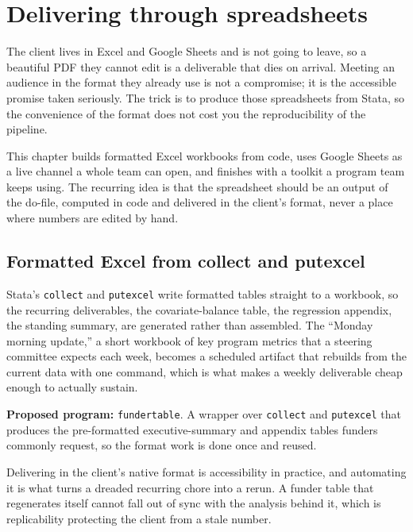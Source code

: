 \documentclass[
    a4paper,
    fontsize=10pt,
    twoside=true,
    numbers=noenddot,
]{kaobook}
\begin{document}
\chapter{Delivering through spreadsheets}\label{ch:sheets}

The client lives in Excel and Google Sheets and is not going to leave, so a beautiful PDF they cannot edit is a deliverable that dies on arrival. Meeting an audience in the format they already use is not a compromise; it is the accessible promise taken seriously. The trick is to produce those spreadsheets from Stata, so the convenience of the format does not cost you the reproducibility of the pipeline.

This chapter builds formatted Excel workbooks from code, uses Google Sheets as a live channel a whole team can open, and finishes with a toolkit a program team keeps using. The recurring idea is that the spreadsheet should be an output of the do-file, computed in code and delivered in the client's format, never a place where numbers are edited by hand.

\section{Formatted Excel from collect and putexcel}
Stata's \texttt{collect} and \texttt{putexcel} write formatted tables straight to a workbook, so the recurring deliverables, the covariate-balance table, the regression appendix, the standing summary, are generated rather than assembled. The \enquote{Monday morning update,} a short workbook of key program metrics that a steering committee expects each week, becomes a scheduled artifact that rebuilds from the current data with one command, which is what makes a weekly deliverable cheap enough to actually sustain.

\begin{kaobox}[frametitle=Ado-file Idea: \texttt{fundertable}]
\textbf{Proposed program:} \texttt{fundertable}. A wrapper over \texttt{collect} and \texttt{putexcel} that produces the pre-formatted executive-summary and appendix tables funders commonly request, so the format work is done once and reused.
\end{kaobox}

Delivering in the client's native format is accessibility in practice, and automating it is what turns a dreaded recurring chore into a rerun. A funder table that regenerates itself cannot fall out of sync with the analysis behind it, which is replicability protecting the client from a stale number.
\end{document}
